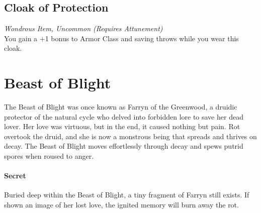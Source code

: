 \documentclass[letterpaper,openany,oneside,twocolumn]{book}
\begin{document}
\subsection*{Cloak of Protection}
\textit{Wondrous Item, Uncommon (Requires Attunement)}\\
You gain a +1 bonus to Armor Class and saving throws while you wear this cloak.


\DungeonSheetGeometry
\section*{Beast of Blight}
{\entryfont The Beast of Blight was once known as Farryn of the Greenwood, a druidic protector of the natural cycle who delved into forbidden lore to save her dead lover. Her love was virtuous, but in the end, it caused nothing but pain. Rot overtook the druid, and she is now a monstrous being that spreads and thrives on decay. The Beast of Blight moves effortlessly through decay and spews putrid spores when roused to anger.

\paragraph*{Secret} Buried deep within the Beast of Blight, a tiny fragment of Farryn still exists. If shown an image of her lost love, the ignited memory will burn away the rot.}
\end{document}
